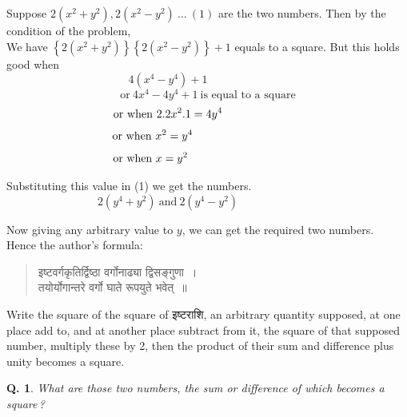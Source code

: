 \documentclass[11pt, openany]{book}
\newtheorem{question}{Q.}
\begin{document}
 Suppose $2(x^{2} + y^{2}), 2(x^{2} - y^{2})\ \ldots\ (1)$ are
the two numbers. 
Then by the condition of the problem, \\

\vspace{-2mm}
 We have $\left\{2(x^{2} + y^{2})\right\} \left\{2(x^{2}  - y^{2})\right\} + 1$
equals to a square. 
But this holds good when 
\begin{equation*}
     4(x^{4}  - y^{4} ) + 1 \hspace{3cm}
\end{equation*}
\begin{equation*}
    \text{or}\ 4x^{4}  - 4y^{4} +1\ \text{is equal to a square}
\end{equation*}
\begin{equation*}
     \text{or when}\ 2. 2x^{2}.1 = 4y^{4}\hspace{2.5cm}
\end{equation*}
\begin{equation*}
    \text{or when}\ x^{2} = y^{4} \hspace{3.45cm}
\end{equation*}
\begin{equation*}
    \text{or when}\ x = y^{2}\hspace{3.6cm}
\end{equation*}

 Substituting this value in (1) we get the numbers. 
\begin{equation*}
    2(y^{4} + y^{2})\ \text{and}\ 2(y^{4}  - y^{2}) \hspace{3cm}
\end{equation*}

\newpage%
 Now giving any arbitrary value to $y$, we can get the 
required two numbers. \\

\vspace{-2mm}
 Hence the author's formula: 
\begin{quote}
    \qt 
    इष्टवर्गकृतिर्द्विष्ठा वर्गोनाढ्या द्विसङ्गुणा~। \\
 तयोर्योगान्तरे वर्गो घाते रूपयुते भवेत्~॥~
\end{quote}
 
 Write the square of the square of इष्टराशि, an arbitrary 
quantity supposed, at one place add to, and at another place 
subtract from it, the square of that supposed number, multiply these by 2, then the product of their sum and difference 
plus unity becomes a square. 
\begin{question}
  What are those two numbers, the sum or 
difference of which becomes a square\,? 
\end{question} 
\vspace{-8mm}
\end{document}

